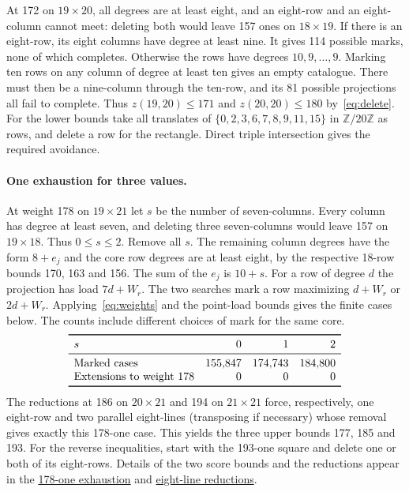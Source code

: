 \documentclass[11pt]{article}
\newcommand{\proofdir}[2]{\href{https://github.com/jasondavies/zarankiewicz-numbers/blob/b33dcd207d62331adc02e1cb6ef0021094ebd40b/#1}{#2}}
\begin{document}
At 172 on $19\times20$, all degrees are at least eight, and an eight-row
and an eight-column cannot meet: deleting both would leave 157 ones on
$18\times19$. If there is an eight-row, its eight columns have degree
at least nine. It gives 114 possible marks, none of which completes.
Otherwise the rows have degrees $10,9,\ldots,9$. Marking ten rows
on any column of degree at least ten gives an empty catalogue. There
must then be a nine-column through the ten-row, and its 81 possible
projections all fail to complete. Thus $z(19,20)\le171$ and
$z(20,20)\le180$ by~\eqref{eq:delete}. For the lower bounds take all
translates of $\{0,2,3,6,7,8,9,11,15\}$ in $\mathbb Z/20\mathbb Z$
as rows, and delete a row for the rectangle. Direct triple intersection
gives the required avoidance.

\paragraph{One exhaustion for three values.}
At weight 178 on $19\times21$ let $s$ be the number of seven-columns.
Every column has degree at least seven, and deleting three seven-columns
would leave 157 on $19\times18$. Thus $0\le s\le2$. Remove all $s$.
The remaining column degrees have the form $8+e_j$ and the core row
degrees are at least eight, by the respective 18-row bounds 170, 163 and
156. The sum of the $e_j$ is $10+s$. For a row of degree $d$ the
projection has load $7d+W_r$. The two searches mark a row maximizing
$d+W_r$ or $2d+W_r$. Applying~\eqref{eq:weights} and the point-load
bounds gives the finite cases below. The counts include different
choices of mark for the same core.
\[
\begin{array}{lrrr}
\toprule
s&0&1&2\\
\midrule
\text{Marked cases}&155{,}847&174{,}743&184{,}800\\
\text{Extensions to weight 178}&0&0&0\\
\bottomrule
\end{array}
\]
The reductions at 186 on $20\times21$ and 194 on $21\times21$ force,
respectively, one eight-row and two parallel eight-lines (transposing if
necessary) whose removal gives exactly this 178-one case. This yields
the three upper bounds 177, 185 and 193. For the reverse inequalities,
start with the 193-one square and delete one or both of its eight-rows.
Details of the two score bounds and the reductions appear in the
\proofdir{z19x21-k33/README.md}{178-one exhaustion} and
\proofdir{z20x21-k33/weight-186.md}{eight-line reductions}.
\end{document}
